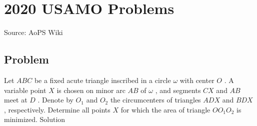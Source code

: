 \documentclass[12pt]{article}
\begin{document}
\section*{{2020 USAMO Problems}}
Source: AoPS Wiki

\subsection*{Problem}
Let $ABC$ be a fixed acute triangle inscribed in a circle $\omega$ with center $O$ . A variable point $X$ is chosen on minor arc $AB$ of $\omega$ , and segments $CX$ and $AB$ meet at $D$ . Denote by $O_1$ and $O_2$ the circumcenters of triangles $ADX$ and $BDX$ , respectively. Determine all points $X$ for which the area of triangle $OO_1O_2$ is minimized. Solution
\end{document}
